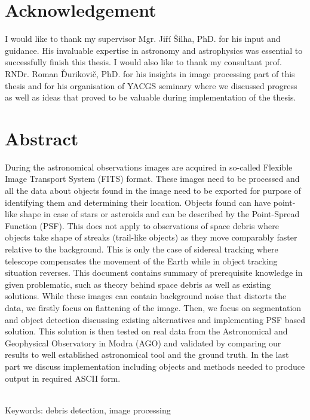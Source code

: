 \documentclass[12pt, a4paper, oneside]{book}
\begin{document}
\pagestyle{empty}
\chapter*{Acknowledgement}\label{chap:thank_you}
I would like to thank my supervisor Mgr. Jiří Šilha, PhD. for his input and guidance.
His invaluable expertise in astronomy and astrophysics was essential to successfully finish this thesis.
I would also like to thank my consultant prof. RNDr. Roman Ďurikovič, PhD. for his insights in image processing part of this thesis and for his organisation of YACGS seminary where we discussed progress as well as ideas that proved to be valuable during implementation of the thesis.
\vfill\eject


\chapter*{Abstract}\label{chap:abstract_en}
During the astronomical observations images are acquired in so-called Flexible Image Transport System (FITS) format.
These images need to be processed and all the data about objects found in the image need to be exported for purpose of identifying them and determining their location.
Objects found can have point-like shape in case of stars or asteroids and can be described by the Point-Spread Function (PSF).
This does not apply to observations of space debris where objects take shape of streaks (trail-like objects) as they move comparably faster relative to the background.
This is only the case of sidereal tracking where telescope compensates the movement of the Earth while in object tracking situation reverses.
This document contains summary of prerequisite knowledge in given problematic, such as theory behind space debris as well as existing solutions.
While these images can contain background noise that distorts the data, we firstly focus on flattening of the image.
Then, we focus on segmentation and object detection discussing existing alternatives and implementing PSF based solution.
This solution is then tested on real data from the Astronomical and Geophysical Observatory in Modra (AGO) and validated by comparing our results to well established astronomical tool and the ground truth.
In the last part we discuss implementation including objects and methods needed to produce output in required ASCII form.


~\\
Keywords: debris detection, image processing
\vfill\eject
\end{document}
